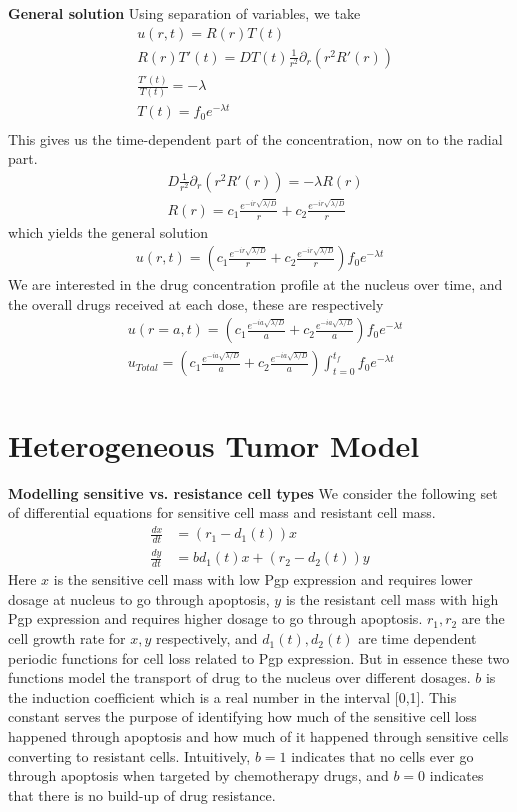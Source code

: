 \documentclass{edm_article}
\begin{document}
\textbf{General solution} Using separation of variables, we take
\begin{align*}
    &u(r,t) = R(r)T(t)\\
    &R(r)T'(t) = DT(t)\frac{1}{r^2}\partial_r(r^2R'(r))\\
    &\frac{T'(t)}{T(t)} = -\lambda\\
    &T(t) = f_0e^{-\lambda t}\\
\end{align*}
This gives us the time-dependent part of the concentration, now on to the radial part.
\begin{align*}
    &D\frac{1}{r^2}\partial_r(r^2R'(r)) = -\lambda R(r)\\
    &R(r) = c_1 \frac{e^{-ir\sqrt{\lambda/D}}}{r} + c_2 \frac{e^{-ir\sqrt{\lambda/D}}}{r}
\end{align*}
which yields the general solution
\begin{align*}
    u(r,t) = (c_1 \frac{e^{-ir\sqrt{\lambda/D}}}{r} + c_2 \frac{e^{-ir\sqrt{\lambda/D}}}{r})f_0e^{-\lambda t}
\end{align*}
We are interested in the drug concentration profile at the nucleus over time, and the overall drugs received at each dose, these are respectively
\begin{align*}
    &u(r = a, t) = (c_1 \frac{e^{-ia\sqrt{\lambda/D}}}{a} + c_2 \frac{e^{-ia\sqrt{\lambda/D}}}{a})f_0e^{-\lambda t}\\
    &u_{Total}= (c_1 \frac{e^{-ia\sqrt{\lambda/D}}}{a} + c_2 \frac{e^{-ia\sqrt{\lambda/D}}}{a})\int_{t = 0}^{t_f}f_0e^{-\lambda t}\\
\end{align*}

\section{Heterogeneous Tumor Model}
\textbf{Modelling sensitive vs. resistance cell types} We consider the following set of differential equations for sensitive cell mass and resistant cell mass.
\begin{align*}
    \frac{dx}{dt} &= (r_1 - d_1(t))x\\
    \frac{dy}{dt} &= bd_1(t)x + (r_2-d_2(t))y
\end{align*}
Here $x$ is the sensitive cell mass with low Pgp expression and requires lower dosage at nucleus to go through apoptosis, $y$ is the resistant cell mass with high Pgp expression and requires higher dosage to go through apoptosis. $r_1, r_2$ are the cell growth rate for $x,y$ respectively, and $d_1(t), d_2(t)$ are time dependent periodic functions for cell loss related to Pgp expression. But in essence these two functions model the transport of drug to the nucleus over different dosages. $b$ is the induction coefficient which is a real number in the interval [0,1]. This constant serves the purpose of identifying how much of the sensitive cell loss happened through apoptosis and how much of it happened through sensitive cells converting to resistant cells. Intuitively, $b = 1$ indicates that no cells ever go through apoptosis when targeted by chemotherapy drugs, and $b = 0$ indicates that there is no build-up of drug resistance. 
\end{document}
